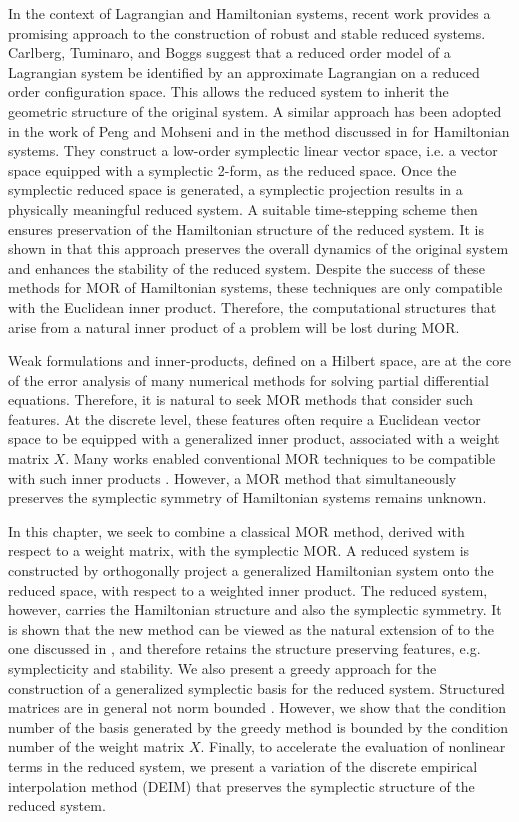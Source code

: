 In the context of Lagrangian and Hamiltonian systems, recent work provides a promising approach to the construction of robust and stable reduced systems. Carlberg, Tuminaro, and Boggs \cite{doi:10.1137/140959602} suggest that a reduced order model of a Lagrangian system be identified by an approximate Lagrangian on a reduced order configuration space. This allows the reduced system to inherit the geometric structure of the original system. A similar approach has been adopted in the work of Peng and Mohseni \cite{doi:10.1137/140978922} and in the method discussed in  for Hamiltonian systems. They construct a low-order symplectic linear vector space, i.e. a vector space equipped with a symplectic 2-form, as the reduced space. Once the symplectic reduced space is generated, a symplectic projection results in a physically meaningful reduced system. A suitable time-stepping scheme then ensures preservation of the Hamiltonian structure of the reduced system. It is shown in \cite{doi:10.1137/17M1111991,doi:10.1137/140978922} that this approach preserves the overall dynamics of the original system and enhances the stability of the reduced system. Despite the success of these methods for MOR of Hamiltonian systems, these techniques are only compatible with the Euclidean inner product. Therefore, the computational structures that arise from a natural inner product of a problem will be lost during MOR.

Weak formulations and inner-products, defined on a Hilbert space, are at the core of the error analysis of many numerical methods for solving partial differential equations. Therefore, it is natural to seek MOR methods that consider such features. At the discrete level, these features often require a Euclidean vector space to be equipped with a generalized inner product, associated with a weight matrix $X$. Many works enabled conventional MOR techniques to be compatible with such inner products \cite{sen2006natural}. However, a MOR method that simultaneously preserves the symplectic symmetry of Hamiltonian systems remains unknown. 

In this chapter, we seek to combine a classical MOR method, derived with respect to a weight matrix, with the symplectic MOR. A reduced system is constructed by orthogonally project a generalized Hamiltonian system onto the reduced space, with respect to a weighted inner product. The reduced system, however, carries the Hamiltonian structure and also the symplectic symmetry. It is shown that the new method can be viewed as the natural extension of to the one discussed in , and therefore retains the structure preserving features, e.g. symplecticity and stability. We also present a greedy approach for the construction of a generalized symplectic basis for the reduced system. Structured matrices are in general not norm bounded \cite{doi:10.1137/050628519}. However, we show that the condition number of the basis generated by the greedy method is bounded by the condition number of the weight matrix $X$. Finally, to accelerate the evaluation of nonlinear terms in the reduced system, we present a variation of the discrete empirical interpolation method (DEIM) that preserves the symplectic structure of the reduced system.

